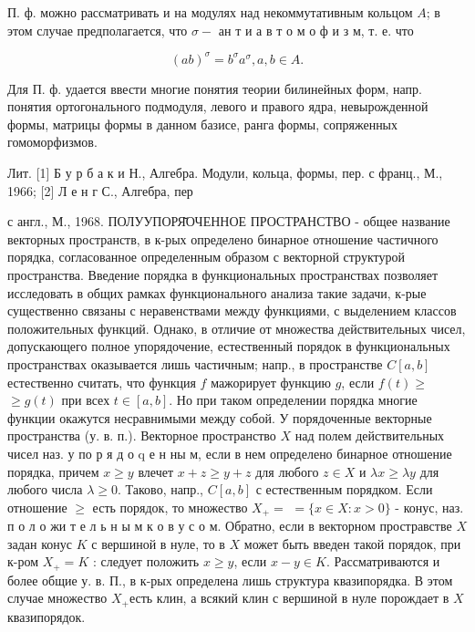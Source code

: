 \documentclass[10pt]{article}
\begin{document}
П. ф. можно рассматривать и на модулях над некоммутативным кольцом $A$; в этом случае предполагается, что $\sigma-$ ан т и а в т о м о ф и з м, т. е. что



\[

(a b)^{\sigma}=b^{\sigma} a^{\sigma}, a, b \in A .

\]



Для П. ф. удается ввести многие понятия теории билинейных форм, напр. понятия ортогонального подмодуля, левого и правого ядра, невырожденной формы, матрицы формы в данном базисе, ранга формы, сопряженных гомоморфизмов.



Лит. [1] Б у р б а к и Н., Алгебра. Модули, кольца, формы, пер. с франц., М., 1966; [2] Л е н г С., Алгебра, пер

с англ., М., 1968. ПОЛУУПОРЯ̆ОЧЕННОЕ ПРОСТРАНСТВО - общее название векторных пространств, в к-рых определено бинарное отношение частичного порядка, согласованное определенным образом с векторной структурой пространства. Введение порядка в функциональных пространствах позволяет исследовать в общих рамках функционального анализа такие задачи, к-рые существенно связаны с неравенствами между функциями, с выделением классов положительных функций. Однако, в отличие от множества действительных чисел, допускающего полное упорядочение, естественный порядок в функциональных пространствах оказывается лишь частичным; напр., в пространстве $C[a, b]$ естественно считать, что функция $f$ мажорирует функцию $g$, если $f(t) \geqslant$ $\geqslant g(t)$ при всех $t \in[a, b]$. Но при таком определении порядка многие функции окажутся несравнимыми между собой. У порядоченные векторные пространства (у. в. п.). Векторное пространство $X$ над полем действительных чисел наз. у по р я д о q е н ны м, если в нем определено бинарное отношение порядка, причем $x \geq y$ влечет $x+z \geqslant y+z$ для любого $z \in X$ и $\lambda x \geqslant \lambda y$ для любого числа $\lambda \geqslant 0$. Таково, напр., $C[a, b]$ с естественным порядком. Если отношение $\geqslant$ есть порядок, то множество $X_{+}=$ $=\{x \in X: x>0\}$ - конус, наз. п о л о жи т е л ь н ы м к о в у с о м. Обратно, если в векторном простравстве $X$ задан конус $K$ с вершиной в нуле, то в $X$ может быть введен такой порядок, при к-ром $X_{+}=K$ : следует положить $x \geqslant y$, если $x-y \in K$. Рассматриваются и более общие у. в. П., в к-рых определена лишь структура квазипорядка. В этом случае множество $X_{+}$есть клин, а всякий клин с вершиной в нуле порождает в $X$ квазипорядок.
\end{document}
